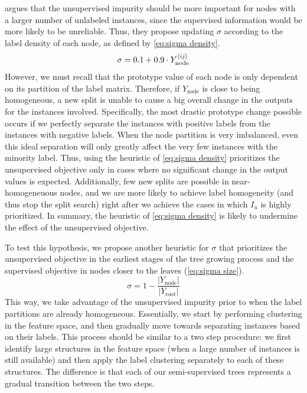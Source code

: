 
\textcite{alves2023semisupervised} argues that the unsupervised impurity should be more important for nodes with a larger number of unlabeled instances, since the supervised information would be more likely to be unreliable. Thus, they propose updating $\sigma$ according to the label density of each node, as defined by \autoref{eq:sigma density}.
%
\begin{equation}
    \sigma = 0.1 + 0.9 \cdot Y_\text{node}^{\langle ij \rangle}
    \label{eq:sigma density}
\end{equation}
%
However, we must recall that the prototype value of each node is only dependent on its partition of the label matrix. Therefore, if $Y_\text{node}$ is close to being homogeneous, a new split is unable to cause a big overall change in the outputs for the instances involved. Specifically, the most drastic prototype change possible occurs if we perfectly separate the instances with positive labels from the instances with negative labels.
When the node partition is very imbalanced, even this ideal separation will only greatly affect the very few instances with the minority label. Thus, using the heuristic of \autoref{eq:sigma density} prioritizes the unsupervised objective only in cases where no significant change in the output values is expected. Additionally, few new splits are possible in near-homogeneuous nodes, and we are more likely to achieve label homogeneity (and thus stop the split search) right after we achieve the cases in which $I_u$ is highly prioritized. In summary, the heuristic of \autoref{eq:sigma density} is likely to undermine the effect of the unsupervised objective.


To test this hypothesis, we propose another heuristic for $\sigma$ that prioritizes the unsupervised objective in the earliest stages of the tree growing process and the supervised objective in nodes closer to the leaves (\autoref{eq:sigma size}).
%
\begin{equation}
    \sigma = 1 - \frac{|Y_\text{node}|}{|Y_\text{root}|}
    \label{eq:sigma size}
\end{equation}
%
This way, we take advantage of the unsupervised impurity prior to when the label partitions are already homogeneous. Essentially, we start by performing clustering in the feature space, and then gradually move towards separating instances based on their labels.
This process should be similar to a two step procedure: we first identify large structures in the feature space (when a large number of instances is still available) and then apply the label clustering separately to each of these structures. The difference is that each of our semi-supervised trees represents a gradual transition between the two steps.

